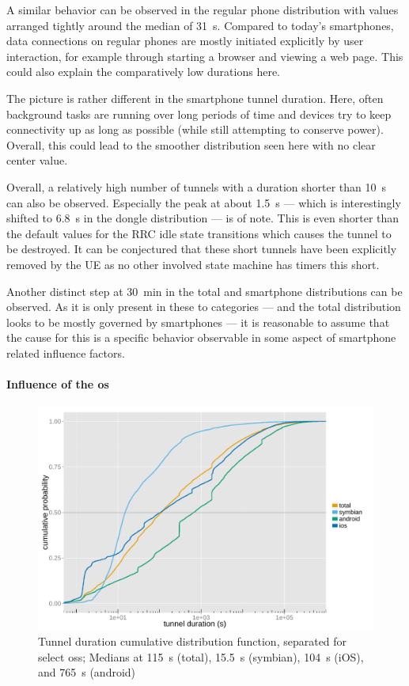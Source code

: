 A similar behavior can be observed in the regular phone distribution with values arranged tightly around the median of \SI{31}{\second}. Compared to today's smartphones, data connections on regular phones are mostly initiated explicitly by user interaction, for example through starting a browser and viewing a web page. This could also explain the comparatively low durations here.

The picture is rather different in the smartphone tunnel duration. Here, often background tasks are running over long periods of time and devices try to keep connectivity up as long as possible (while still attempting to conserve power). Overall, this could lead to the smoother distribution seen here with no clear center value.

Overall, a relatively high number of tunnels with a duration shorter than \SI{10}{\second} can also be observed. Especially the peak at about \SI{1.5}{\second} --- which is interestingly shifted to \SI{6.8}{\second} in the dongle distribution --- is of note. This is even shorter than the default values for the \gls{RRC} idle state transitions which causes the tunnel to be destroyed. It can be conjectured that these short tunnels have been explicitly removed by the \gls{UE} as no other involved state machine has timers this short.

Another distinct step at \SI{30}{\minute} in the total and smartphone distributions can be observed. As it is only present in these to categories --- and the total distribution looks to be mostly governed by smartphones --- it is reasonable to assume that the cause for this is a specific behavior observable in some aspect of smartphone related influence factors.


\paragraph{Influence of the \texorpdfstring{\acrshort{os}}{OS}}

\begin{figure}[htb]
	\centering
	\includegraphics[width=1.0\textwidth]{images/R-tunnel-duration-operating-system.pdf}
	\caption{Tunnel duration cumulative distribution function, separated for select \glspl{os}; Medians at \SI{115}{\second} (total), \SI{15.5}{\second} (symbian), \SI{104}{\second} (iOS), and \SI{765}{\second} (android)}
\label{c4:fig:cdf-duration-os}
\end{figure}


